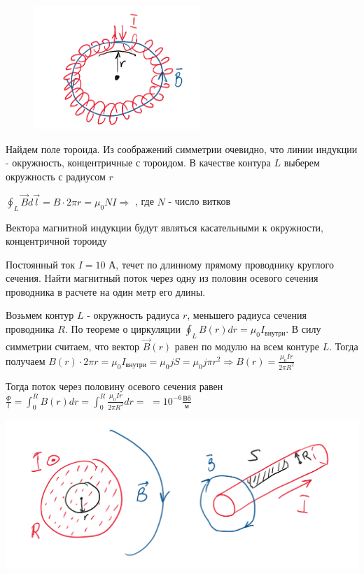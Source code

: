 \documentclass[12pt]{article}
\begin{document}
\begin{minipage}{\textwidth}
    \begin{figure}
        \includegraphics[width=6.3cm]{physics2/images/physics2_2025_02_17_2}
    \end{figure}

    \Ex Найдем поле тороида. Из соображений симметрии очевидно, что линии индукции - окружность, концентричные с тороидом. В качестве контура $L$ выберем окружность с радиусом $r$

    $\oint_L \vec{B} d\vec{l} = B \cdot 2\pi r = \mu_0 N I \Longrightarrow$ , 
    где $N$ - число витков

    Вектора магнитной индукции будут являться касательными к окружности, концентричной тороиду

\end{minipage}

\Ex Постоянный ток $I = 10$ А, течет по длинному прямому проводнику круглого сечения. Найти магнитный поток через одну
из половин осевого сечения проводника в расчете на один метр его длины.

\mediumvspace

Возьмем контур $L$ - окружность радиуса $r$, меньшего радиуса сечения проводника $R$. 
По теореме о циркуляции $\oint_L B(r) dr = \mu_0 I_\text{внутри}$. В силу симметрии считаем, что вектор $\vec B(r)$ равен по модулю на всем контуре $L$.
Тогда получаем $B(r) \cdot 2\pi r = \mu_0 I_\text{внутри} = \mu_0 j S = \mu_0 j \pi r^2 \Longrightarrow B(r) = \frac{\mu_0 I r}{2 \pi R^2}$

Тогда поток через половину осевого сечения равен $\frac{\Phi}{l} = \int_0^R B(r) dr = \int_0^R \frac{\mu_0 I r}{2\pi R^2} dr = $  $ = 10^{-6} \frac{\text{Вб}}{\text{м}}$

\includegraphics[width=15cm]{physics2/images/physics2_2025_02_17_3}
\end{document}
